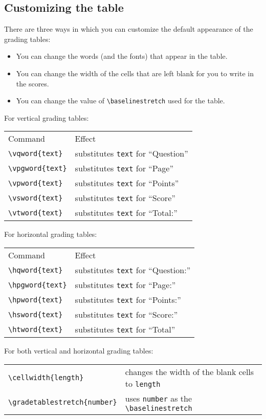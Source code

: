 \documentclass[12pt]{exam}
\begin{document}
\subsection{Customizing the table}
\label{sec:CustTable}

There are three ways in which you can customize the default appearance
of the grading tables:
\begin{itemize}
\item You can change the words (and the fonts) that appear in the
  table.
\item You can change the width of the cells that are left blank for
  you to write in the scores.
\item You can change the value of \verb"\baselinestretch" used for the
  table.
\end{itemize}
For vertical grading tables:
\begin{center}
\begin{tabular}{l@{\qquad}l}
Command& Effect\\
\verb"\vqword{text}"& substitutes \verb"text" for ``Question''\\
\verb"\vpgword{text}"& substitutes \verb"text" for ``Page''\\
\verb"\vpword{text}"& substitutes \verb"text" for ``Points''\\
\verb"\vsword{text}"& substitutes \verb"text" for ``Score''\\
\verb"\vtword{text}"& substitutes \verb"text" for ``Total:''
\end{tabular}
\end{center}
For horizontal grading tables:
\begin{center}
\begin{tabular}{l@{\qquad}l}
Command& Effect\\
\verb"\hqword{text}"& substitutes \verb"text" for ``Question:''\\
\verb"\hpgword{text}"& substitutes \verb"text" for ``Page:''\\
\verb"\hpword{text}"& substitutes \verb"text" for ``Points:''\\
\verb"\hsword{text}"& substitutes \verb"text" for ``Score:''\\
\verb"\htword{text}"& substitutes \verb"text" for ``Total''
\end{tabular}
\end{center}
For both vertical and horizontal grading tables:
\begin{center}
  \begin{tabular}{l@{\qquad}l}
    \verb"\cellwidth{length}"& changes the width of the blank cells to
    \verb"length"\\
    \verb"\gradetablestretch{number}"& uses \verb"number" as the
    \verb"\baselinestretch"
  \end{tabular}
\end{center}
\end{document}
